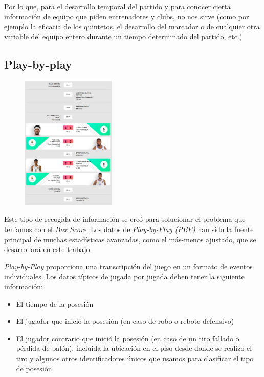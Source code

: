 \documentclass[paper=a4, fontsize=9pt]{article}
\begin{document}
Por lo que, para el desarrollo temporal del partido y para conocer cierta información de equipo que piden entrenadores y clubs, no nos sirve (como por ejemplo la eficacia de los quintetos, el desarrollo del marcador o de cualquier otra variable del equipo entero durante un tiempo determinado del partido, etc.)



\subsection{Play-by-play}

\begin{figure}
\centering
\includegraphics[width=0.4\textwidth]{imagenes/PBP_RM.png}
\captionsetup{width=.9\linewidth}
\label{fig:PBP_RM}
\end{figure}

Este tipo de recogida de información se creó para solucionar el problema que teníamos con el \emph{Box Score}. Los datos de \emph{Play-by-Play (PBP)} han sido la fuente principal de muchas estadísticas avanzadas, como el más-menos ajustado, que se desarrollará en este trabajo.

\emph{Play-by-Play} proporciona una transcripción del juego en un formato de eventos individuales. Los datos típicos de jugada por jugada deben tener la siguiente información:

\begin{itemize}
\item El tiempo de la posesión
\item El jugador que inició la posesión (en caso de robo o rebote defensivo)
\item El jugador contrario que inició la posesión (en caso de un tiro fallado o pérdida de balón), incluida la ubicación en el piso desde donde se realizó el tiro y algunos otros identificadores únicos que usamos para clasificar el tipo de posesión.
\end{itemize}
\end{document}
